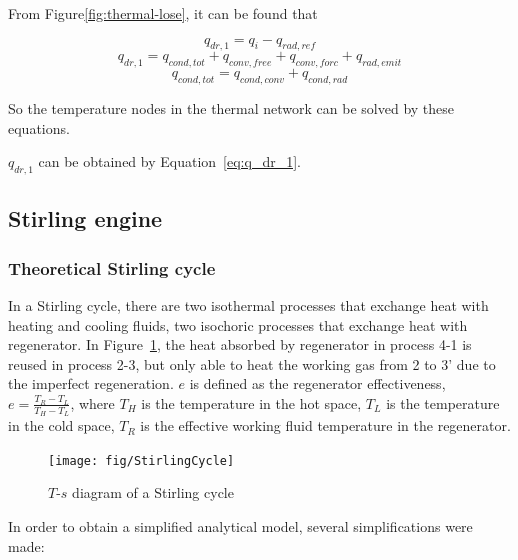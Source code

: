 From Figure\ref{fig:thermal-lose}, it can be found that

\begin{equation}
  q_{dr,1} = q_i - q_{rad,ref}
\end{equation}
\begin{equation}
  q_{dr,1} = q_{cond,tot} + q_{conv,free} + q_{conv,forc}+q_{rad,emit}
\end{equation}
\begin{equation}
  q_{cond,tot} = q_{cond,conv}+q_{cond,rad}
\end{equation}

So the temperature nodes in the thermal network can be solved by these equations.

$q_{dr,1}$ can be obtained by Equation~\ref{eq:q_dr_1}.

\subsection{Stirling engine}\label{sec:StirlingEngineModel}
\subsubsection{Theoretical Stirling cycle}
In a Stirling cycle, there are two isothermal processes that exchange heat with heating and cooling fluids, two isochoric processes that exchange heat with regenerator. In Figure~\ref{fig:StirlingCycle}, the heat absorbed by regenerator in process 4-1 is reused in process 2-3, but only able to heat the working gas from 2 to 3' due to the imperfect regeneration. $e$ is defined as the regenerator effectiveness\cite{Formosa2010,Juhasz2010}, $e=\frac{T_R-T_L}{T_H-T_L}$, where $T_H$ is the temperature in the hot space, $T_L$ is the temperature in the cold space, $T_R$ is the effective working fluid temperature in the regenerator.

\noindent \begin{figure}[htbp]
\begin{center}
	\texttt{[image: fig/StirlingCycle]}
	\caption{$T$-$s$ diagram of a Stirling cycle}
	\label{fig:StirlingCycle}
\end{center}
\end{figure}

In order to obtain a simplified analytical model, several simplifications were made:

